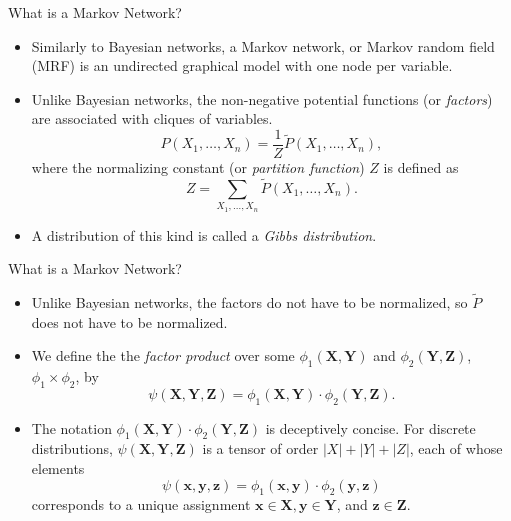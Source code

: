 \documentclass[11pt]{beamer}
\begin{document}
\begin{frame}{What is a Markov Network?}
\begin{itemize}
	\item Similarly to Bayesian networks, a Markov network, or Markov random
	field (MRF) is an undirected graphical model with one node per variable.
	\item Unlike Bayesian networks, the non-negative potential functions (or
	\emph{factors}) are associated with cliques of variables.
	\[
		P(X_{1}, \ldots, X_{n}) = \frac{1}{Z} \tilde{P}(X_{1}, \ldots,
		X_{n}),
	\]
	where the normalizing constant (or \emph{partition function}) $Z$ is
	defined as
	\[
		Z = \sum_{X_{1}, \ldots, X_{n}} \tilde{P}(X_{1}, \ldots, X_{n}).
	\]
	\item A distribution of this kind is called a \emph{Gibbs distribution}.
\end{itemize}
\end{frame}

\begin{frame}{What is a Markov Network?}
\begin{itemize}
	\item Unlike Bayesian networks, the factors do not have to be
	normalized, so $\tilde{P}$ does not have to be normalized.
	\item We define the the \emph{factor product} over some
	$\phi_{1}(\boldsymbol{X}, \boldsymbol{Y})$ and $\phi_{2}(\boldsymbol{Y},
	\boldsymbol{Z})$, $\phi_{1} \times \phi_{2}$, by
	\[
		\psi(\boldsymbol{X}, \boldsymbol{Y}, \boldsymbol{Z}) =
		\phi_{1}(\boldsymbol{X}, \boldsymbol{Y}) \cdot
		\phi_{2}(\boldsymbol{Y}, \boldsymbol{Z}).
	\]
	\item The notation $\phi_{1}(\boldsymbol{X}, \boldsymbol{Y}) \cdot
	\phi_{2}(\boldsymbol{Y}, \boldsymbol{Z})$ is deceptively concise. For
	discrete distributions, $\psi(\boldsymbol{X}, \boldsymbol{Y},
	\boldsymbol{Z})$ is a tensor of order $|X| + |Y| + |Z|$, each of whose
	elements
	\[
		\psi(\boldsymbol{x}, \boldsymbol{y}, \boldsymbol{z}) =
		\phi_{1}(\boldsymbol{x}, \boldsymbol{y}) \cdot
		\phi_{2}(\boldsymbol{y}, \boldsymbol{z})
	\]
	corresponds to a unique assignment $\boldsymbol{x} \in \boldsymbol{X},
	\boldsymbol{y} \in \boldsymbol{Y}$, and $\boldsymbol{z} \in
	\boldsymbol{Z}$.
	
\end{itemize}
\end{frame}
\end{document}
